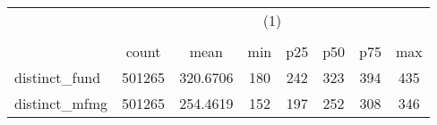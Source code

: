 \documentclass{article}
\begin{document}
{
\def\sym#1{\ifmmode^{#1}\else\(^{#1}\)\fi}
\begin{tabular}{l*{1}{ccccccc}}
\hline\hline
            &\multicolumn{7}{c}{(1)}                                                                   \\
            &\multicolumn{7}{c}{}                                                                      \\
            &       count&        mean&         min&         p25&         p50&         p75&         max\\
\hline
distinct\_fund&      501265&    320.6706&         180&         242&         323&         394&         435\\
distinct\_mfmg&      501265&    254.4619&         152&         197&         252&         308&         346\\
\hline\hline
\end{tabular}
}
\end{document}

